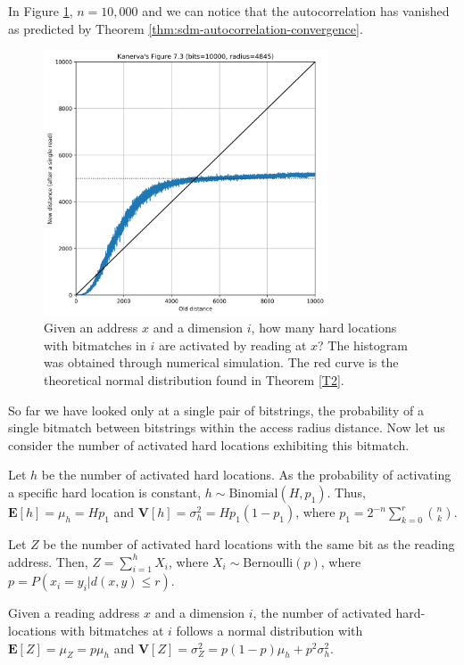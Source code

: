 In Figure \ref{fig:sdm-10kbits-figure-7-3}, $n=10,000$ and we can notice that the autocorrelation has vanished as predicted by Theorem \ref{thm:sdm-autocorrelation-convergence}.

\begin{figure}[!htb]
  \centering
  \includegraphics[width=0.75\textwidth]{./images02/sdm-10000bits-10000w-table-7-2.png}

  \caption{Given an address $x$ and a dimension $i$, how many hard locations with bitmatches in $i$ are activated by reading at $x$?  The histogram was obtained through numerical simulation. The red curve is the theoretical normal distribution found in Theorem \ref{T2}.}
  \label{fig:sdm-10kbits-figure-7-3}
\end{figure}

So far we have looked only at a single pair of bitstrings, the probability of a single bitmatch between bitstrings within the access radius distance.  Now let us consider the number of activated hard locations exhibiting this bitmatch.

Let $h$ be the number of activated hard locations. As the probability of activating a specific hard location is constant, $h \sim \text{Binomial}(H, p_1)$. Thus, $\mathbf{E}[h] = \mu_h = Hp_1$ and $\mathbf{V}[h] = \sigma^2_h = Hp_1(1-p_1)$, where $p_1 = 2^{-n} \sum_{k=0}^{r} \binom{n}{k}$.

Let $Z$ be the number of activated hard locations with the same bit as the reading address. Then, $Z = \sum_{i=1}^{h} X_i$, where $X_i \sim \text{Bernoulli}(p)$, where $p = P(x_i = y_i | d(x, y) \le r)$.

\begin{theorem}
Given a reading address $x$ and a dimension $i$, the number of activated hard-locations with bitmatches at $i$ follows a normal distribution with $\mathbf{E}[Z] = \mu_Z = p \mu_h$ and $\mathbf{V}[Z] = \sigma_Z^2 = p(1-p) \mu_h + p^2 \sigma^2_h$.
\label{T2}
\end{theorem}

